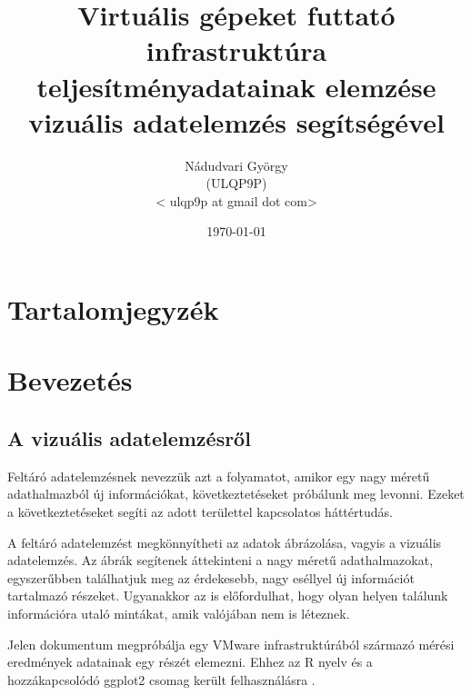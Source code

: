 \documentclass[a4paper,10pt,titlepage]{article}
\newcommand{\szerzo}{Nádudvari György}
\newcommand{\szerzoneptun}{ULQP9P}
\newcommand{\szerzomail}{ulqp9p at gmail dot com}
\newcommand{\cim}{Virtuális gépeket futtató infrastruktúra teljesítményadatainak elemzése vizuális adatelemzés segítségével}
\begin{document}

\begin{titlepage}
    \title{\cim}
    \author{\szerzo \\ (\szerzoneptun) \\ < \szerzomail >}
    \date{\today}
\end{titlepage}
\maketitle

\section*{Tartalomjegyzék}
\makeatletter
{}
\makeatother

\section{Bevezetés}
\subsection{A vizuális adatelemzésről}

Feltáró adatelemzésnek nevezzük azt a folyamatot, amikor egy nagy méretű adathalmazból új információkat, következtetéseket próbálunk meg levonni. Ezeket a következtetéseket segíti az adott területtel kapcsolatos háttértudás.

A feltáró adatelemzést megkönnyítheti az adatok ábrázolása, vagyis a vizuális adatelemzés. Az ábrák segítenek áttekinteni a nagy méretű adathalmazokat, egyszerűbben találhatjuk meg az érdekesebb, nagy eséllyel új információt tartalmazó részeket. Ugyanakkor az is előfordulhat, hogy olyan helyen találunk információra utaló mintákat, amik valójában nem is léteznek.

Jelen dokumentum megpróbálja egy VMware infrastruktúrából származó mérési eredmények adatainak egy részét elemezni. Ehhez az R nyelv és a hozzákapcsolódó ggplot2 csomag került felhasználásra \cite{link:R, link:GG2}.


\end{document}

